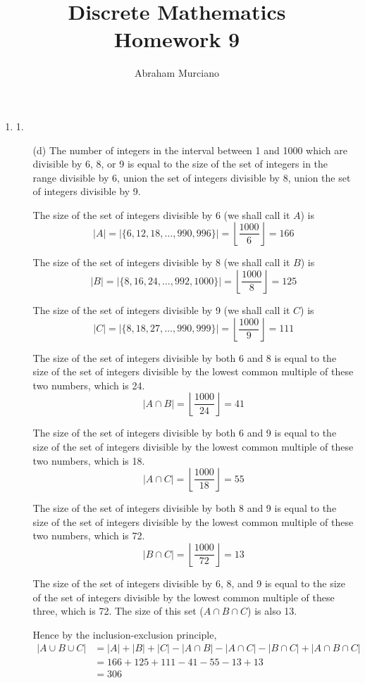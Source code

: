 \documentclass[fleqn]{article}
\title{Discrete Mathematics \\
\medskip
\large Homework 9}
\author{Abraham Murciano}
\newenvironment{answers}{ %
	\begin{enumerate}
		\setlength{\itemsep}{\bigskipamount}
}{\end{enumerate}}
\begin{document}
\maketitle

\begin{answers}

    \item[1.]
    \begin{enumerate}
		\item[(d)]
		The number of integers in the interval between 1 and 1000 which are divisible by 6, 8, or 9 is equal to the size of the set of integers in the range divisible by 6, union the set of integers divisible by 8, union the set of integers divisible by 9.

		The size of the set of integers divisible by 6 (we shall call it \(A\)) is
		\[|A| = \left|\{6, 12, 18, \dots, 990, 996\}\right| = \left\lfloor\frac{1000}{6}\right\rfloor = 166\]

		The size of the set of integers divisible by 8 (we shall call it \(B\)) is
		\[|B| = \left|\{8, 16, 24, \dots, 992, 1000\}\right| = \left\lfloor\frac{1000}{8}\right\rfloor = 125\]

		The size of the set of integers divisible by 9 (we shall call it \(C\)) is
		\[|C| = \left|\{8, 18, 27, \dots, 990, 999\}\right| = \left\lfloor\frac{1000}{9}\right\rfloor = 111\]

		The size of the set of integers divisible by both 6 and 8 is equal to the size of the set of integers divisible by the lowest common multiple of these two numbers, which is 24.
		\[|A \cap B| = \left\lfloor\frac{1000}{24}\right\rfloor = 41\]

		The size of the set of integers divisible by both 6 and 9 is equal to the size of the set of integers divisible by the lowest common multiple of these two numbers, which is 18.
		\[|A \cap C| = \left\lfloor\frac{1000}{18}\right\rfloor = 55\]

		The size of the set of integers divisible by both 8 and 9 is equal to the size of the set of integers divisible by the lowest common multiple of these two numbers, which is 72.
		\[|B \cap C| = \left\lfloor\frac{1000}{72}\right\rfloor = 13\]

		The size of the set of integers divisible by 6, 8, and 9 is equal to the size of the set of integers divisible by the lowest common multiple of these three, which is 72. The size of this set (\(A \cap B \cap C\)) is also 13.

		Hence by the inclusion-exclusion principle,
		\begin{align*}
			|A\cup B\cup C|&=|A|+|B|+|C|-|A\cap B|-|A\cap C|-|B\cap C|+|A\cap B\cap C| \\
			&= 166+125+111-41-55-13+13 \\
			&= 306
		\end{align*}


\end{enumerate}
\end{answers}
\end{document}
